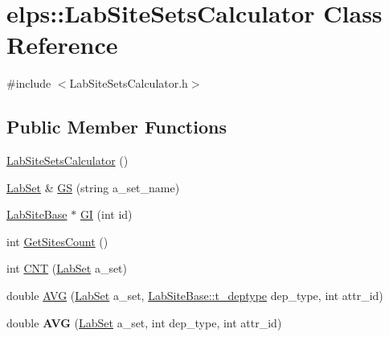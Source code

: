 \hypertarget{classelps_1_1_lab_site_sets_calculator}{\section{elps\+:\+:Lab\+Site\+Sets\+Calculator Class Reference}
\label{classelps_1_1_lab_site_sets_calculator}
}


{\ttfamily \#include $<$Lab\+Site\+Sets\+Calculator.\+h$>$}

\subsection*{Public Member Functions}
\begin{DoxyCompactItemize}
\item 
\hyperlink{classelps_1_1_lab_site_sets_calculator_a1799c961ddc95105e89421f4bd1d3e6d}{Lab\+Site\+Sets\+Calculator} ()
\item 
\hyperlink{classelps_1_1_lab_set}{Lab\+Set} \& \hyperlink{classelps_1_1_lab_site_sets_calculator_a3a56fb6bbb50896eba98aa8ffbf56d53}{G\+S} (string a\+\_\+set\+\_\+name)
\item 
\hyperlink{classelps_1_1_lab_site_base}{Lab\+Site\+Base} $\ast$ \hyperlink{classelps_1_1_lab_site_sets_calculator_a4d9a4b4ee46bf9d16480a7d3ed127e55}{G\+I} (int id)
\item 
int \hyperlink{classelps_1_1_lab_site_sets_calculator_a34ece437f367f6a4e0c32e4ccf3be5a4}{Get\+Sites\+Count} ()
\item 
int \hyperlink{classelps_1_1_lab_site_sets_calculator_a79239505385e0c9425f0c1ae2d69e2e3}{C\+N\+T} (\hyperlink{classelps_1_1_lab_set}{Lab\+Set} a\+\_\+set)
\item 
double \hyperlink{classelps_1_1_lab_site_sets_calculator_adea86bfd1715f7a2ec7878faa931d0bc}{A\+V\+G} (\hyperlink{classelps_1_1_lab_set}{Lab\+Set} a\+\_\+set, \hyperlink{classelps_1_1_lab_site_base_a8ec08fafa015dfa53827d985608afe58}{Lab\+Site\+Base\+::t\+\_\+deptype} dep\+\_\+type, int attr\+\_\+id)
\item 
\hypertarget{classelps_1_1_lab_site_sets_calculator_a38586ebe52e4e11af50951a885af4916}{double {\bfseries A\+V\+G} (\hyperlink{classelps_1_1_lab_set}{Lab\+Set} a\+\_\+set, int dep\+\_\+type, int attr\+\_\+id)}\label{classelps_1_1_lab_site_sets_calculator_a38586ebe52e4e11af50951a885af4916}


\end{DoxyCompactItemize}
